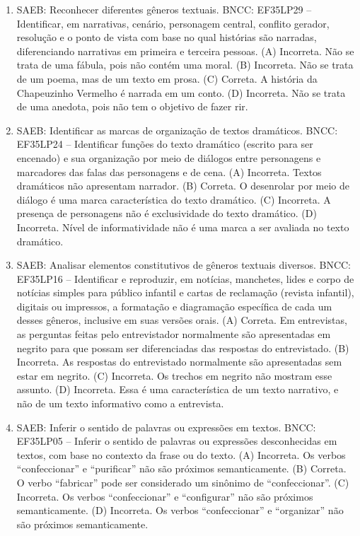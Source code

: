 
\begin{enumerate}
\item
SAEB: Reconhecer diferentes gêneros textuais.
BNCC: EF35LP29 -- Identificar, em narrativas, cenário, personagem central,
conflito gerador, resolução e o ponto de vista com base no qual
histórias são narradas, diferenciando narrativas em primeira e terceira
pessoas.
(A) Incorreta. Não se trata de uma fábula, pois não contém uma moral.
(B) Incorreta. Não se trata de um poema, mas de um texto em prosa.
(C) Correta. A história da Chapeuzinho Vermelho é narrada em um conto.
(D) Incorreta. Não se trata de uma anedota, pois não tem o objetivo de fazer rir.

\item
SAEB: Identificar as marcas de organização de textos dramáticos.
BNCC: EF35LP24 -- Identificar funções do texto dramático (escrito para ser encenado) e sua organização
por meio de diálogos entre personagens e marcadores das falas das personagens e de cena.
(A) Incorreta. Textos dramáticos não apresentam narrador.
(B) Correta. O desenrolar por meio de diálogo é uma marca característica do texto dramático.
(C) Incorreta. A presença de personagens não é exclusividade do texto dramático.
(D) Incorreta. Nível de informatividade não é uma marca a ser avaliada no texto dramático.

\item
SAEB: Analisar elementos constitutivos de gêneros textuais diversos.
BNCC: EF35LP16 -- Identificar e reproduzir, em notícias, manchetes, lides e
corpo de notícias simples para público infantil e cartas de reclamação
(revista infantil), digitais ou impressos, a formatação e diagramação
específica de cada um desses gêneros, inclusive em suas versões orais.
(A) Correta. Em entrevistas, as perguntas feitas pelo entrevistador
normalmente são apresentadas em negrito para que possam ser
diferenciadas das respostas do entrevistado.
(B) Incorreta. As respostas do entrevistado normalmente são apresentadas
sem estar em negrito.
(C) Incorreta. Os trechos em negrito não mostram esse assunto.
(D) Incorreta. Essa é uma característica de um texto narrativo, e não de
um texto informativo como a entrevista.

\item
SAEB: Inferir o sentido de palavras ou expressões em textos.
BNCC: EF35LP05 -- Inferir o sentido de palavras ou expressões desconhecidas em textos, com base no
contexto da frase ou do texto.
(A) Incorreta. Os verbos ``confeccionar'' e ``purificar'' não são próximos semanticamente.
(B) Correta. O verbo ``fabricar'' pode ser considerado um sinônimo de ``confeccionar''.
(C) Incorreta. Os verbos ``confeccionar'' e ``configurar'' não são próximos semanticamente.
(D) Incorreta. Os verbos ``confeccionar'' e ``organizar'' não são próximos semanticamente.


\end{enumerate}
